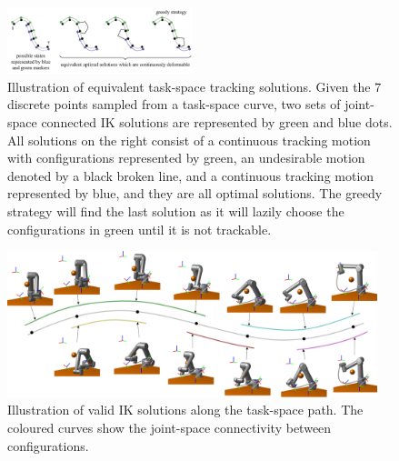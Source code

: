 \documentclass[letterpaper, 10 pt, conference]{ieeeconf}  %
\begin{document}
\begin{figure}[t]
\centering
\includegraphics[width=0.48\textwidth]{figures/greedy}
\caption{Illustration of equivalent task-space tracking solutions. Given the $7$ discrete points sampled from a task-space curve, two sets of joint-space connected IK solutions are represented by green and blue dots. All solutions on the right consist of a continuous tracking motion with configurations represented by green, an undesirable motion denoted by a black broken line, and a continuous tracking motion represented by blue, and they are all optimal solutions. The greedy strategy will find the last solution as it will lazily choose the configurations in green until it is not trackable.}\label{fig:equiv}
\vspace{-0.5cm}
\end{figure}


\begin{figure}[t]
\centering
\includegraphics[width=0.96\textwidth]{figures/case_study/comb_3}
\caption{Illustration of valid IK solutions along the task-space path. 
The coloured curves show the joint-space connectivity between configurations. }\label{fig:allpose}
\vspace{-0.5cm}
\end{figure}
\end{document}
